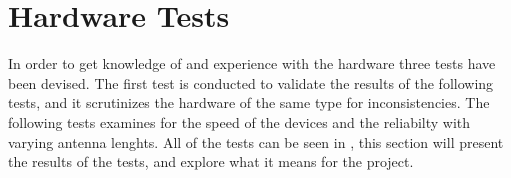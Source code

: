 \clearpage
\section{Hardware Tests} %
\label{sec:hardware_tests}
In order to get knowledge of and experience with the hardware three tests have been devised.
The first test is conducted to validate the results of the following tests, and it scrutinizes the hardware of the same type for inconsistencies.
The following tests examines for the speed of the devices and the reliabilty with varying antenna lenghts.
All of the tests can be seen in , this section will present the results of the tests, and explore what it means for the project.
